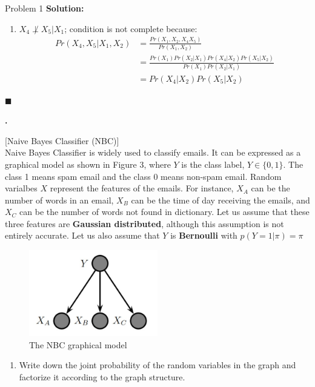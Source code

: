\documentclass{article}
\newcounter{pcounter}                                   %
\newenvironment{problem}                                %
{                                                       %
    \color{gray}                                        %
    \stepcounter{pcounter}                              %
    \textbf{\arabic{pcounter}.}                         %
}{}                                                     %
\newenvironment{solution}                               %
{\textbf{Solution:} }{$\blacksquare$}                   %
\begin{document}
\begin{section}{Problem 1}
\begin{solution}
\begin{enumerate}[label=(\alph*)]
                \item $X_4 \not\perp X_5 | X_1$; condition is not complete because:
                \begin{align*}
                    Pr(X_4, X_5 | X_1, X_2) &= \frac{Pr(X_1, X_2, X_4 X_5)}{Pr(X_1, X_2)} \\
                    &= \frac{Pr(X_1) Pr(X_2|X_1) Pr(X_4|X_2) Pr(X_5|X_2)}{Pr(X_1) Pr(X_2|X_1)} \\
                    &=  Pr(X_4|X_2) Pr(X_5|X_2)
                \end{align*}
            \end{enumerate}
        \end{solution}

        \begin{problem}
            [Naive Bayes Classifier (NBC)]\\
            Naive Bayes Classifier is widely used to classify emails. It can be expressed as a graphical model as shown in Figure 3, where $Y$ is the class label, $Y \in \{0, 1\}$. The class 1 means spam email and the class 0 means non-spam email.
            Random varialbes $X$ represent the features of the emails. For instance, $X_A$ can be the number of words in an email, $X_B$ can be the time of day receiving the emails, and $X_C$ can be the number of words not found in dictionary.
            Let us assume that these three features are \textbf{Gaussian distributed}, although this assumption is not entirely accurate. Let us also assume that $Y$ is \textbf{Bernoulli} with $p(Y=1 | \pi) = \pi$
            \begin{figure}[H]
                \label{fig:m3}
                \centering
                \includegraphics[width=0.5\textwidth]{a2_p12}
                \caption{The NBC graphical model}
            \end{figure}
            \begin{enumerate}[label=(\alph*)]
                \item Write down the joint probability of the random variables in the graph and factorize it according to the graph structure.

\end{enumerate}
\end{problem}
\end{section}
\end{document}
